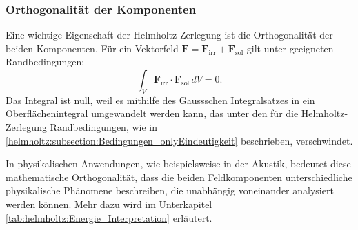 \subsubsection{Orthogonalität der Komponenten}

Eine wichtige Eigenschaft der Helmholtz-Zerlegung ist die Orthogonalität der beiden Komponenten. Für ein Vektorfeld $\boldsymbol{F} = \boldsymbol{F}_{\text{irr}} + \boldsymbol{F}_{\text{sol}}$ gilt unter geeigneten Randbedingungen:
\begin{equation}
\int_V \boldsymbol{F}_{\text{irr}} \cdot \boldsymbol{F}_{\text{sol}} \, dV = 0.
\end{equation}
Das Integral ist null, weil es mithilfe des Gaussschen Integralsatzes in ein Oberflächenintegral umgewandelt werden kann, das unter den für die Helmholtz-Zerlegung Randbedingungen, wie in \ref{helmholtz:subsection:Bedingungen_onlyEindeutigkeit} beschrieben, verschwindet.
 
In physikalischen Anwendungen, wie beispielsweise in der Akustik, bedeutet diese mathematische Orthogonalität, dass die beiden Feldkomponenten unterschiedliche physikalische Phänomene beschreiben, die unabhängig voneinander analysiert werden können. Mehr dazu wird im Unterkapitel \ref{tab:helmholtz:Energie_Interpretation} erläutert.


